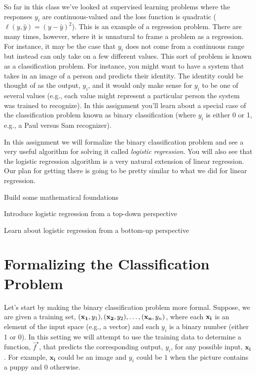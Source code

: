 \documentclass[assignment03_Solutions]{subfiles}
\begin{document}
So far in this class we've looked at supervised learning problems where the responses $y_i$ are continuous-valued and the loss function is quadratic ($\ell(y, \hat{y}) = (y-\hat{y})^2$).  This is an example of a regression problem.  There are many times, however, where it is unnatural to frame a problem as a regression.  For instance, it may be the case that $y_i$ does not come from a continuous range but instead can only take on a few different values.  This sort of problem is known as a classification problem.  For instance, you might want to have a system that takes in an image of a person and predicts their identity.  The identity could be thought of as the output, $y_i$, and it would only make sense for $y_i$ to be one of several values (e.g., each value might represent a particular person the system was trained to recognize).  In this assignment you'll learn about a special case of the classification problem known as binary classification (where $y_i$ is either 0 or 1, e.g., a Paul versus Sam recognizer).

In this assignment we will formalize the binary classification problem and see a very useful algorithm for solving it called \emph{logistic regression}.  You will also see that the logistic regression algorithm is a very natural extension of linear regression.  Our plan for getting there is going to be pretty similar to what we did for linear regression.
\bi
\item Build some mathematical foundations
\item Introduce logistic regression from a top-down perspective
\item Learn about logistic regression from a bottom-up perspective
\ei

\section{Formalizing the Classification Problem}
Let's start by making the binary classification problem more formal.  Suppose, we are given a training set, $(\mathbf{x_1}, y_1), (\mathbf{x_2}, y_2), \ldots, (\mathbf{x_n}, y_n)$, where each $\mathbf{x_i}$ is an element of the input space (e.g., a vector) and each $y_i$ is a binary number (either 1 or 0).  In this setting we will attempt to use the training data to determine a function, $\hat{f}^\star$, that predicts the corresponding output, $y_i$, for any possible input, $\mathbf{x_i}$.  For example,  $\mathbf{x_i}$ could be an image and $y_i$ could be $1$ when the picture contains a puppy and $0$ otherwise.
\end{document}
